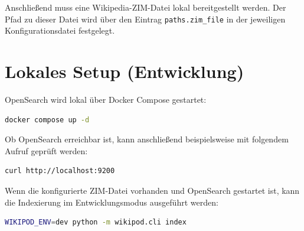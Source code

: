 Anschließend muss eine Wikipedia-ZIM-Datei lokal bereitgestellt werden. Der
Pfad zu dieser Datei wird über den Eintrag \texttt{paths.zim\_file} in der
jeweiligen Konfigurationsdatei festgelegt.

\par\bigskip
\noindent\begin{minipage}{\linewidth}
\section{Lokales Setup (Entwicklung)}

OpenSearch wird lokal über Docker Compose gestartet:

\par\nopagebreak[4]\smallskip
\noindent\begin{minipage}[t]{\linewidth}
\vspace{0pt}
\begin{lstlisting}[language=bash]
docker compose up -d
\end{lstlisting}
\end{minipage}\par\smallskip
\end{minipage}\par\smallskip

Ob OpenSearch erreichbar ist, kann anschließend beispielsweise mit folgendem
Aufruf geprüft werden:

\par\nopagebreak[4]\smallskip
\noindent\begin{minipage}[t]{\linewidth}
\vspace{0pt}
\begin{lstlisting}[language=bash]
curl http://localhost:9200
\end{lstlisting}
\end{minipage}\par\smallskip

Wenn die konfigurierte ZIM-Datei vorhanden und OpenSearch gestartet ist, kann
die Indexierung im Entwicklungsmodus ausgeführt werden:

\par\nopagebreak[4]\smallskip
\noindent\begin{minipage}[t]{\linewidth}
\vspace{0pt}
\begin{lstlisting}[language=bash]
WIKIPOD_ENV=dev python -m wikipod.cli index
\end{lstlisting}
\end{minipage}\par\smallskip

